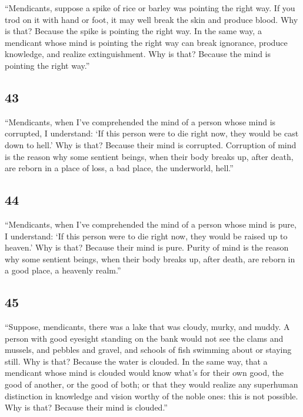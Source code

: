 \documentclass[12pt,openany]{book}%
\begin{document}
“Mendicants, suppose a spike of rice or barley was pointing the right way. If you trod on it with hand or foot, it may well break the skin and produce blood. Why is that? Because the spike is pointing the right way. In the same way, a mendicant whose mind is pointing the right way can break ignorance, produce knowledge, and realize extinguishment. Why is that? Because the mind is pointing the right way.” 

\subsection*{43 }

“Mendicants, when I’ve comprehended the mind of a person whose mind is corrupted, I understand: ‘If this person were to die right now, they would be cast down to hell.’ Why is that? Because their mind is corrupted. Corruption of mind is the reason why some sentient beings, when their body breaks up, after death, are reborn in a place of loss, a bad place, the underworld, hell.” 

\subsection*{44 }

“Mendicants, when I’ve comprehended the mind of a person whose mind is pure, I understand: ‘If this person were to die right now, they would be raised up to heaven.’ Why is that? Because their mind is pure. Purity of mind is the reason why some sentient beings, when their body breaks up, after death, are reborn in a good place, a heavenly realm.” 

\subsection*{45 }

“Suppose, mendicants, there was a lake that was cloudy, murky, and muddy. A person with good eyesight standing on the bank would not see the clams and mussels, and pebbles and gravel, and schools of fish swimming about or staying still. Why is that? Because the water is clouded. In the same way, that a mendicant whose mind is clouded would know what’s for their own good, the good of another, or the good of both; or that they would realize any superhuman distinction in knowledge and vision worthy of the noble ones: this is not possible. Why is that? Because their mind is clouded.” 
\end{document}
